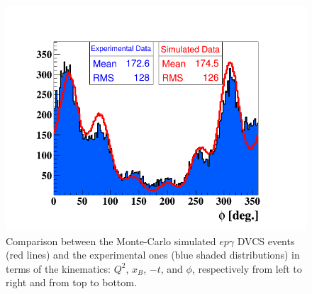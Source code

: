 \begin{figure}[h!]
\includegraphics[scale=0.35]{fig_dvcs/comp/phi_h_InCoh.png}
\caption{Comparison between the Monte-Carlo simulated $ep\gamma$ DVCS events 
(red lines) and the experimental ones (blue shaded distributions) in terms of 
the kinematics: $Q^{2}$, $x_{B}$, $-t$, and $\phi$, respectively from left to 
right and from top to bottom.}
\label{fig:incoh_coparison_with_simulation_1}
\end{figure}


